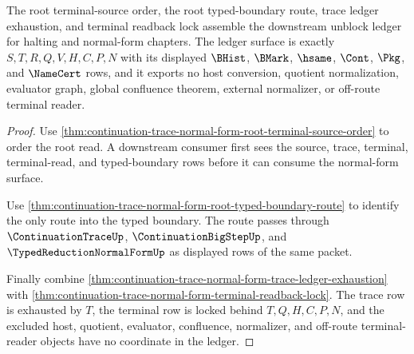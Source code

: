 \begin{theorem}
\label{thm:continuation-trace-normal-form-root-downstream-unblock-ledger}
The root terminal-source order, the root typed-boundary route, trace ledger exhaustion, and terminal readback lock assemble the downstream unblock ledger for halting and normal-form chapters. The ledger surface is exactly $S,T,R,Q,V,H,C,P,N$ with its displayed $\BHist$, $\BMark$, $\hsame$, $\Cont$, $\Pkg$, and $\NameCert$ rows, and it exports no host conversion, quotient normalization, evaluator graph, global confluence theorem, external normalizer, or off-route terminal reader.
\end{theorem}
\begin{proof}
Use \autoref{thm:continuation-trace-normal-form-root-terminal-source-order} to order the root read. A downstream consumer first sees the source, trace, terminal, terminal-read, and typed-boundary rows before it can consume the normal-form surface.

Use \autoref{thm:continuation-trace-normal-form-root-typed-boundary-route} to identify the only route into the typed boundary. The route passes through $\ContinuationTraceUp$, $\ContinuationBigStepUp$, and $\TypedReductionNormalFormUp$ as displayed rows of the same packet.

Finally combine \autoref{thm:continuation-trace-normal-form-trace-ledger-exhaustion} with \autoref{thm:continuation-trace-normal-form-terminal-readback-lock}. The trace row is exhausted by $T$, the terminal row is locked behind $T,Q,H,C,P,N$, and the excluded host, quotient, evaluator, confluence, normalizer, and off-route terminal-reader objects have no coordinate in the ledger.
\end{proof}

